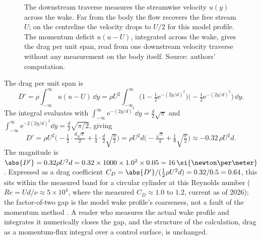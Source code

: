 \begin{figure}[h]
  \centering
  
  \caption[Wake velocity profile behind a bluff body.]{The downstream
  traverse measures the streamwise velocity $u(y)$ across the wake. Far
  from the body the flow recovers the free stream $U$; on the
  centreline the velocity drops to $U/2$ for this model profile. The
  momentum deficit $u(u - U)$, integrated across the wake, gives the
  drag per unit span, read from one downstream velocity traverse
  without any measurement on the body itself. Source: authors'
  computation.}
  \label{fig:vol02:ch08:wake-profile}
\end{figure}

\noindent The drag per unit span is
\[
D' = \rho\int_{-\infty}^{\infty}u(u - U)\,\dd y = \rho U^{2}
\int_{-\infty}^{\infty}\Big(1 - \tfrac{1}{2}\mathrm{e}^{-(2y/d)^{2}}
\Big)\Big(-\tfrac{1}{2}\mathrm{e}^{-(2y/d)^{2}}\Big)\,\dd y.
\]
The integral evaluates with $\int_{-\infty}^{\infty}\mathrm{e}^{-(2y/
d)^{2}}\dd y = \tfrac{d}{2}\sqrt{\pi}$ and $\int_{-\infty}^{\infty}
\mathrm{e}^{-2(2y/d)^{2}}\dd y = \tfrac{d}{2}\sqrt{\pi/2}$, giving
\[
D' = \rho U^{2}\Big(-\tfrac{1}{2}\cdot\tfrac{d\sqrt{\pi}}{2} +
\tfrac{1}{4}\cdot\tfrac{d}{2}\sqrt{\tfrac{\pi}{2}}\Big) = \rho U^{2}d
\Big(-\tfrac{\sqrt{\pi}}{4} + \tfrac{1}{8}\sqrt{\tfrac{\pi}{2}}\Big)
\approx -0.32\,\rho U^{2}d.
\]
The magnitude is $\abs{D'} = 0.32\rho U^{2}d = 0.32\times 1000\times
1.0^{2}\times 0.05 = 16\,\si{\newton\per\meter}$. Expressed as a drag
coefficient $C_{D} = \abs{D'}/(\tfrac{1}{2}\rho U^{2}d) = 0.32/0.5 =
0.64$, this sits within the measured band for a circular cylinder at
this Reynolds number ($Re = Ud/\nu \approx 5\times 10^{4}$, where the
measured $C_{D} \approx 1.0$ to $1.2$, current as of 2026); the
factor-of-two gap is the model wake profile's coarseness, not a fault
of the momentum method \cite{text:white-fluid-mechanics}. A reader who
measures the actual wake profile and integrates it numerically closes
the gap, and the structure of the calculation, drag as a momentum-flux
integral over a control surface, is unchanged.

